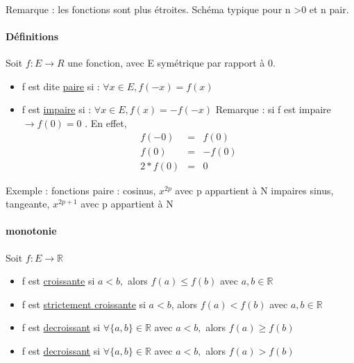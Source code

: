 ~\\
~\\
~\\
Remarque : les fonctions sont plus étroites. Schéma typique pour n >0 et n pair.

\paragraph{Définitions} Soit $f:E \rightarrow R$ une fonction, avec E symétrique par rapport à 0.
\begin{itemize}
	\item f est dite \ul{paire} si : $\forall x \in E, f(-x) = f(x)$
	\item f est \ul{impaire} si : $\forall x \in E, f(x) = - f(-x)$ Remarque : si f est impaire $\rightarrow f(0) = 0$ . En effet, 
		\begin{eqnarray}
			f(-0) & = & f(0) \\
			f(0) & = & -f(0) \\
			2*f(0) & = & 0
		\end{eqnarray}
\end{itemize}

Exemple : fonctions paire : cosinus, $x^{2p}$ avec p appartient à N
impaires sinus, tangeante, $x^{2p+1}$ avec p appartient à N

\paragraph{monotonie} Soit $f:E \rightarrow \mathbb{R}$

\begin{itemize}
	\item f est \ul{croissante} si $a < b,$ alors $f(a) \leq f(b)$ avec $a, b \in \mathbb{R}$
	\item f est \ul{strictement croissante} si $a < b$, alors $f(a) < f(b)$ avec $a, b \in \mathbb{R}$
	\item f est \ul{decroissant} si $ \forall \{a, b\} \in \mathbb{R}$ avec $a < b,$ alors $f(a) \geq f(b)$
	\item f est \ul{decroissant} si $ \forall \{a, b\} \in \mathbb{R}$ avec $a < b,$ alors $f(a) > f(b)$
\end{itemize}

